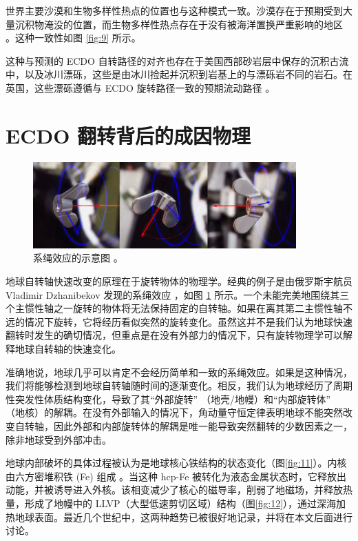 \documentclass[10pt,twocolumn,letterpaper]{article}
\begin{document}
世界主要沙漠和生物多样性热点的位置也与这种模式一致。沙漠存在于预期受到大量沉积物淹没的位置，而生物多样性热点存在于没有被海洋置换严重影响的地区 \cite{28}。这种一致性如图 \ref{fig:9} 所示。

这种与预测的 ECDO 自转路径的对齐也存在于美国西部砂岩层中保存的沉积古流中，以及冰川漂砾，这些是由冰川捡起并沉积到岩基上的与漂砾岩不同的岩石。在英国，这些漂砾遵循与 ECDO 旋转路径一致的预期流动路径 \cite{67,68}。

\section{ECDO 翻转背后的成因物理}

\begin{figure}
\begin{center}
\includegraphics[width=0.9\textwidth]{dzhani.jpg}
\end{center}
   \caption{系绳效应的示意图 \cite{28}。}
\label{fig:10}
\end{figure}

地球自转轴快速改变的原理在于旋转物体的物理学。经典的例子是由俄罗斯宇航员 Vladimir Dzhanibekov 发现的系绳效应 \cite{37}，如图 \ref{fig:10} 所示。一个未能完美地围绕其三个主惯性轴之一旋转的物体将无法保持固定的自转轴。如果在离其第二主惯性轴不远的情况下旋转，它将经历看似突然的旋转变化。虽然这并不是我们认为地球快速翻转时发生的确切情况，但重点是在没有外部力的情况下，只有旋转物理学可以解释地球自转轴的快速变化。

准确地说，地球几乎可以肯定不会经历简单和一致的系绳效应。如果是这种情况，我们将能够检测到地球自转轴随时间的逐渐变化。相反，我们认为地球经历了周期性突发性体质结构变化，导致了其“外部旋转” （地壳/地幔）和“内部旋转体” （地核）的解耦。在没有外部输入的情况下，角动量守恒定律表明地球不能突然改变自转轴，因此外部和内部旋转体的解耦是唯一能导致突然翻转的少数因素之一，除非地球受到外部冲击。

地球内部破坏的具体过程被认为是地球核心铁结构的状态变化（图\ref{fig:11}）。内核由六方密堆积铁 (Fe) 组成 \cite{141}。当这种 hcp-Fe 被转化为液态金属状态时，它释放出动能，并被诱导进入外核。该相变减少了核心的磁导率，削弱了地磁场，并释放热量，形成了地幔中的 LLVP（大型低速剪切区域）结构（图\ref{fig:12}）\cite{38}，通过深海加热地球表面。最近几个世纪中，这两种趋势已被很好地记录，并将在本文后面进行讨论。
\end{document}
